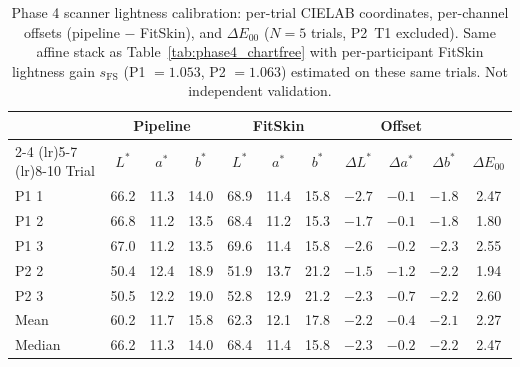 \begin{table}[h]
\centering
\caption{Phase 4 scanner lightness calibration: per-trial CIELAB coordinates, per-channel offsets (pipeline $-$ FitSkin), and $\Delta E_{00}$ ($N = 5$ trials, P2~T1 excluded). Same affine stack as Table~\ref{tab:phase4_chartfree} with per-participant FitSkin lightness gain $s_{\mathrm{FS}}$ (P1 $= 1.053$, P2 $= 1.063$) estimated on these same trials. Not independent validation.}
\label{tab:phase4_fitskin}
\begin{tabular}{lcccccccccc}
\toprule
& \multicolumn{3}{c}{Pipeline} & \multicolumn{3}{c}{FitSkin} &
\multicolumn{3}{c}{Offset} & \\
\cmidrule(lr){2-4} \cmidrule(lr){5-7} \cmidrule(lr){8-10}
Trial & $L^*$ & $a^*$ & $b^*$ & $L^*$ & $a^*$ & $b^*$ &
$\Delta L^*$ & $\Delta a^*$ & $\Delta b^*$ & $\Delta E_{00}$ \\
\midrule
P1 1 & 66.2 & 11.3 & 14.0 & 68.9 & 11.4 & 15.8 & $-2.7$ & $-0.1$ & $-1.8$ & 2.47 \\
P1 2 & 66.8 & 11.2 & 13.5 & 68.4 & 11.2 & 15.3 & $-1.7$ & $-0.1$ & $-1.8$ & 1.80 \\
P1 3 & 67.0 & 11.2 & 13.5 & 69.6 & 11.4 & 15.8 & $-2.6$ & $-0.2$ & $-2.3$ & 2.55 \\
P2 2 & 50.4 & 12.4 & 18.9 & 51.9 & 13.7 & 21.2 & $-1.5$ & $-1.2$ & $-2.2$ & 1.94 \\
P2 3 & 50.5 & 12.2 & 19.0 & 52.8 & 12.9 & 21.2 & $-2.3$ & $-0.7$ & $-2.2$ & 2.60 \\
\midrule
Mean   & 60.2 & 11.7 & 15.8 & 62.3 & 12.1 & 17.8 & $-2.2$ & $-0.4$ & $-2.1$ & 2.27 \\
Median & 66.2 & 11.3 & 14.0 & 68.4 & 11.4 & 15.8 & $-2.3$ & $-0.2$ & $-2.2$ & 2.47 \\
\bottomrule
\end{tabular}
\end{table}
